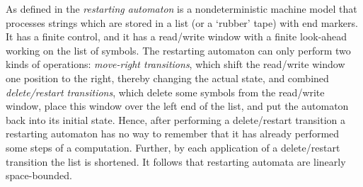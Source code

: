 As defined in \cite{JMPV95} the \emph{restarting automaton} is a nondeterministic machine model that processes strings which are stored in a list (or a ‘rubber’ tape) with end markers. It has a finite control, and it has a read/write window with a finite look-ahead working on the list of symbols. The restarting automaton can only perform two kinds of operations:  \emph{move-right transitions}, which shift the read/write window one position to the right, thereby changing the actual state, and combined \emph{delete/restart transitions}, which delete some symbols from the read/write window, place this window over the left end of the list, and put the automaton back into its initial state. Hence, after performing a delete/restart transition a restarting automaton has no way to remember that it has already performed some steps of a computation. Further, by each application of a delete/restart transition the list is shortened. It follows that restarting automata are linearly space-bounded.

